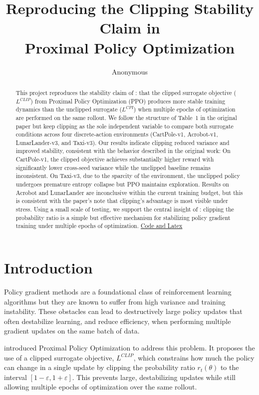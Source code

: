 \documentclass{article}
\title{Reproducing the Clipping Stability Claim in\\Proximal Policy Optimization}
\author{Anonymous}
\begin{document}
\maketitle

\begin{abstract}
This project reproduces the stability claim of \citet{schulman2017ppo}: that the clipped surrogate objective ($L^{CLIP}$) from Proximal Policy Optimization (PPO) produces more stable training dynamics than the unclipped surrogate ($L^{CPI}$) when multiple epochs of optimization are performed on the same rollout. We follow the structure of Table~1 in the original paper but keep clipping as the sole independent variable to compare both surrogate conditions across four discrete-action environments (CartPole-v1, Acrobot-v1, LunarLander-v3, and Taxi-v3). Our results indicate clipping reduced variance and improved stability, consistent with the behavior described in the original work: On CartPole-v1, the clipped objective achieves substantially higher reward with significantly lower cross-seed variance while the unclipped baseline remains inconsistent. On Taxi-v3, due to the sparcity of the environment, the unclipped policy undergoes premature entropy collapse but PPO maintains exploration. Results on Acrobot and LunarLander are inconclusive within the current training budget, but this is consistent with the paper's note that clipping's advantage is most visible under stress. Using a small scale of testing, we support the central insight of \citet{schulman2017ppo}: clipping the probability ratio is a simple but effective mechanism for stabilizing policy gradient training under multiple epochs of optimization. \hspace{4 cm} \href{https://github.com/morderbet/ECE570-Project-PPO-Reproduction}{Code and Latex}
\end{abstract}

\section{Introduction}

Policy gradient methods are a foundational class of reinforcement learning algorithms but they are known to suffer from high variance and training instability. These obstacles can lead to destructively large policy updates that often destabilize learning, and reduce efficiency, when performing multiple gradient updates on the same batch of data.

\citet{schulman2017ppo} introduced Proximal Policy Optimization to address this problem. It proposes the use of a clipped surrogate objective, $L^{CLIP}$, which constrains how much the policy can change in a single update by clipping the probability ratio $r_t(\theta)$ to the interval $[1-\varepsilon, 1+\varepsilon]$. This prevents large, destabilizing updates while still allowing multiple epochs of optimization over the same rollout.
\end{document}

